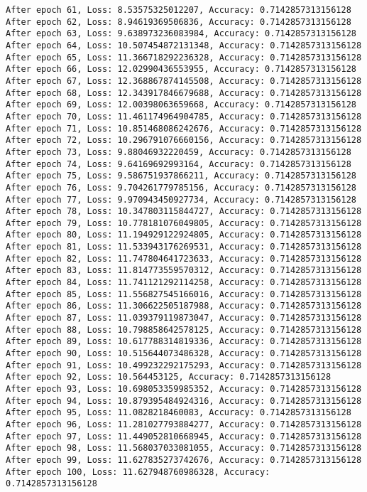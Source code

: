 \documentclass[11pt]{article}
\begin{document}
    \begin{Verbatim}[commandchars=\\\{\}]
After epoch 61, Loss: 8.53575325012207, Accuracy: 0.7142857313156128
After epoch 62, Loss: 8.94619369506836, Accuracy: 0.7142857313156128
After epoch 63, Loss: 9.638973236083984, Accuracy: 0.7142857313156128
After epoch 64, Loss: 10.507454872131348, Accuracy: 0.7142857313156128
After epoch 65, Loss: 11.366718292236328, Accuracy: 0.7142857313156128
After epoch 66, Loss: 12.02990436553955, Accuracy: 0.7142857313156128
After epoch 67, Loss: 12.368867874145508, Accuracy: 0.7142857313156128
After epoch 68, Loss: 12.343917846679688, Accuracy: 0.7142857313156128
After epoch 69, Loss: 12.00398063659668, Accuracy: 0.7142857313156128
After epoch 70, Loss: 11.461174964904785, Accuracy: 0.7142857313156128
After epoch 71, Loss: 10.851468086242676, Accuracy: 0.7142857313156128
After epoch 72, Loss: 10.296791076660156, Accuracy: 0.7142857313156128
After epoch 73, Loss: 9.88046932220459, Accuracy: 0.7142857313156128
After epoch 74, Loss: 9.64169692993164, Accuracy: 0.7142857313156128
After epoch 75, Loss: 9.586751937866211, Accuracy: 0.7142857313156128
After epoch 76, Loss: 9.704261779785156, Accuracy: 0.7142857313156128
After epoch 77, Loss: 9.970943450927734, Accuracy: 0.7142857313156128
After epoch 78, Loss: 10.347803115844727, Accuracy: 0.7142857313156128
After epoch 79, Loss: 10.778181076049805, Accuracy: 0.7142857313156128
After epoch 80, Loss: 11.194929122924805, Accuracy: 0.7142857313156128
After epoch 81, Loss: 11.533943176269531, Accuracy: 0.7142857313156128
After epoch 82, Loss: 11.747804641723633, Accuracy: 0.7142857313156128
After epoch 83, Loss: 11.814773559570312, Accuracy: 0.7142857313156128
After epoch 84, Loss: 11.741121292114258, Accuracy: 0.7142857313156128
After epoch 85, Loss: 11.556827545166016, Accuracy: 0.7142857313156128
After epoch 86, Loss: 11.306622505187988, Accuracy: 0.7142857313156128
After epoch 87, Loss: 11.039379119873047, Accuracy: 0.7142857313156128
After epoch 88, Loss: 10.798858642578125, Accuracy: 0.7142857313156128
After epoch 89, Loss: 10.617788314819336, Accuracy: 0.7142857313156128
After epoch 90, Loss: 10.515644073486328, Accuracy: 0.7142857313156128
After epoch 91, Loss: 10.499232292175293, Accuracy: 0.7142857313156128
After epoch 92, Loss: 10.564453125, Accuracy: 0.7142857313156128
After epoch 93, Loss: 10.698053359985352, Accuracy: 0.7142857313156128
After epoch 94, Loss: 10.879395484924316, Accuracy: 0.7142857313156128
After epoch 95, Loss: 11.0828218460083, Accuracy: 0.7142857313156128
After epoch 96, Loss: 11.281027793884277, Accuracy: 0.7142857313156128
After epoch 97, Loss: 11.449052810668945, Accuracy: 0.7142857313156128
After epoch 98, Loss: 11.568037033081055, Accuracy: 0.7142857313156128
After epoch 99, Loss: 11.627835273742676, Accuracy: 0.7142857313156128
After epoch 100, Loss: 11.627948760986328, Accuracy: 0.7142857313156128

    \end{Verbatim}
\end{document}
